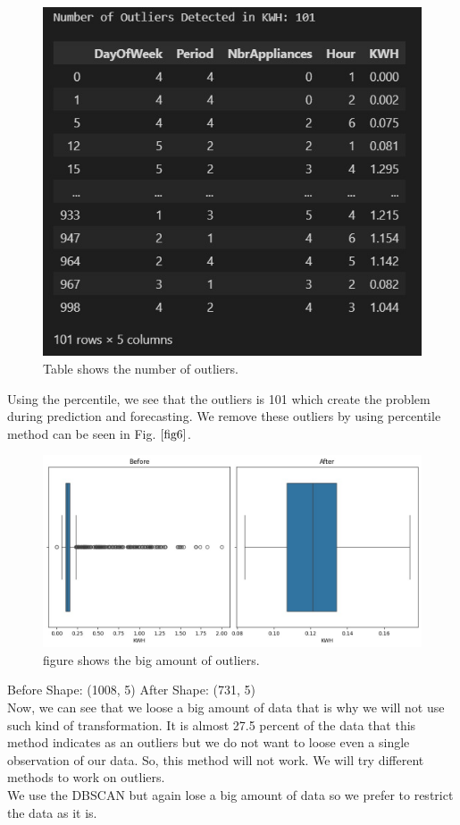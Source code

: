 \documentclass[english,12pt, titlepage]{article}
\begin{document}
	
	\begin{figure}[!ht]
		\centering
		\includegraphics[width=0.5\linewidth]{fig5.jpeg}
		\caption{Table shows the number of outliers.}\label{fig6}
	\end{figure}
	
	Using the percentile, we see that the outliers is 101 which create the problem during prediction and forecasting. We remove these outliers by using percentile method can be seen in Fig. $\ref{fig6}$. 
	
	
	\begin{figure}[!ht]
		\centering
		\includegraphics[width=0.7\linewidth]{fig6.jpeg}
		\caption{figure shows the big amount of outliers.}\label{fig7}
	\end{figure}
	
	Before Shape: (1008, 5)
	After Shape: (731, 5)\\
	Now, we can see that we loose a big amount of data that is why we will not use such kind of transformation. It is almost 27.5 percent of the data that this method indicates as an outliers but we do not want to loose even a single observation of our data. So, this method will not work. We will try different methods to work on outliers.\\
	
	We use the DBSCAN but again lose a big amount of data so we prefer to restrict the data as it is.    
	
\end{document}
